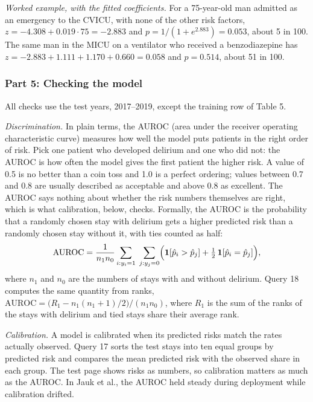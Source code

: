\documentclass[10pt]{article}
\begin{document}
\emph{Worked example, with the fitted coefficients.} For a 75-year-old man admitted as an emergency to the CVICU, with none of the other risk factors, $z = -4.308 + 0.019 \cdot 75 = -2.883$ and $p = 1 / (1 + e^{2.883}) = 0.053$, about 5 in 100. The same man in the MICU on a ventilator who received a benzodiazepine has $z = -2.883 + 1.111 + 1.170 + 0.660 = 0.058$ and $p = 0.514$, about 51 in 100.



\subsubsection*{Part 5: Checking the model}

All checks use the test years, 2017--2019, except the training row of Table 5.

\emph{Discrimination.} In plain terms, the AUROC (area under the receiver operating characteristic curve) measures how well the model puts patients in the right order of risk. Pick one patient who developed delirium and one who did not: the AUROC is how often the model gives the first patient the higher risk. A value of 0.5 is no better than a coin toss and 1.0 is a perfect ordering; values between 0.7 and 0.8 are usually described as acceptable and above 0.8 as excellent. The AUROC says nothing about whether the risk numbers themselves are right, which is what calibration, below, checks. Formally, the AUROC is the probability that a randomly chosen stay with delirium gets a higher predicted risk than a randomly chosen stay without it, with ties counted as half:
\begin{equation*}
	\text{AUROC} = \frac{1}{n_1 n_0} \sum_{i : y_i = 1} \; \sum_{j : y_j = 0} \Bigl( \mathbf{1}[\hat{p}_i > \hat{p}_j] + \tfrac{1}{2} \, \mathbf{1}[\hat{p}_i = \hat{p}_j] \Bigr) ,
\end{equation*}
where $n_1$ and $n_0$ are the numbers of stays with and without delirium. Query 18 computes the same quantity from ranks, $\text{AUROC} = \bigl( R_1 - n_1 (n_1 + 1) / 2 \bigr) / (n_1 n_0)$, where $R_1$ is the sum of the ranks of the stays with delirium and tied stays share their average rank.

\emph{Calibration.} A model is calibrated when its predicted risks match the rates actually observed. Query 17 sorts the test stays into ten equal groups by predicted risk and compares the mean predicted risk with the observed share in each group. The test page shows risks as numbers, so calibration matters as much as the AUROC. In Jauk et al., the AUROC held steady during deployment while calibration drifted.
\end{document}
